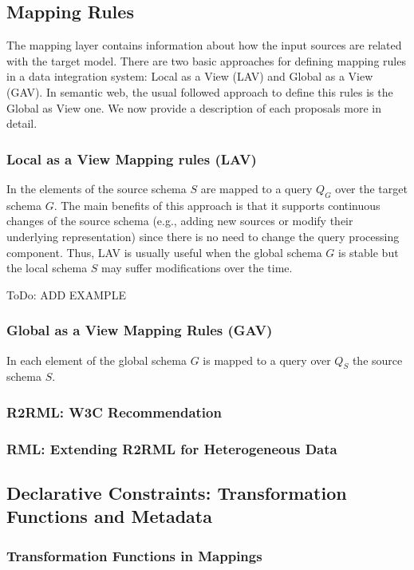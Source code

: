 \subsection{Mapping Rules}
The mapping layer contains information about how the input sources are related with the target model. There are two basic approaches for defining mapping rules in a data integration system: Local as a View (LAV) and Global as a View (GAV). In semantic web, the usual followed approach to define this rules is the Global as View one. We now provide a description of each proposals more in detail.

\subsubsection{Local as a View Mapping rules (LAV)}
In \citep{ullman1997information} the elements of the source schema $S$ are mapped  to a query $Q_G$ over the target schema $G$. The main benefits of this approach is that it supports continuous changes of the source schema (e.g., adding new sources or modify their underlying representation) since there is no need to change the query processing component. Thus, LAV is usually useful when the global schema $G$ is stable but the local schema $S$ may suffer modifications over the time.


ToDo: ADD EXAMPLE

\subsubsection{Global as a View Mapping Rules (GAV)}
In \citep{halevy2001answering} each element of the global schema $G$ is mapped to a query over $Q_S$ the source schema $S$. 


\subsubsection{R2RML: W3C Recommendation}

\subsubsection{RML: Extending R2RML for Heterogeneous Data}

\subsection{Declarative Constraints: Transformation Functions and Metadata}

\subsubsection{Transformation Functions in Mappings}


